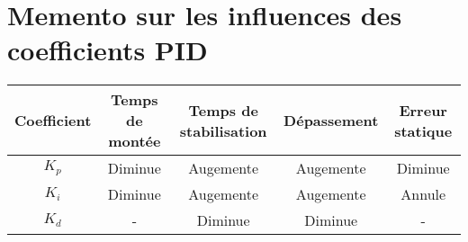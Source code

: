 \newpage
\chapter{Memento sur les influences des coefficients PID}
    \begin{tabular}{|c|c|c|c|c|}
        \hline
        Coefficient& Temps de montée& Temps de stabilisation& Dépassement& Erreur statique\\
        \hline
        \hline
        $K_p$ & Diminue & Augemente & Augemente & Diminue \\
        \hline
        $K_i$ & Diminue & Augemente & Augemente & Annule \\
        \hline
        $K_d$ & - & Diminue & Diminue & - \\
        \hline
     \end{tabular}